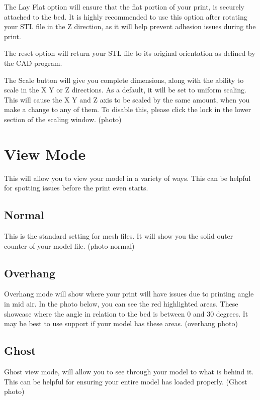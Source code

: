 The Lay Flat option will ensure that the flat portion of your print, is securely attached to the bed. It is highly recommended to use this option after rotating your STL file in the Z direction, as it will help prevent adhesion issues during the print.

The reset option will return your STL file to its original orientation as defined by the CAD program. 

The Scale button will give you complete dimensions, along with the ability to scale in the X Y or Z directions. As a default, it will be set to uniform scaling. This will cause the X Y and Z axis to be scaled by the same amount, when you make a change to any of them. To disable this, please click the lock in the lower section of the scaling window. (photo)

\section{View Mode}

This will allow you to view your model in a variety of ways. This can be helpful for spotting issues before the print even starts. 

\subsection{Normal}

This is the standard setting for mesh files. It will show you the solid outer counter of your model file. (photo normal)

\subsection{Overhang}

Overhang mode will show where your print will have issues due to printing angle in mid air. In the photo below, you can see the red highlighted areas. These showcase where the angle in relation to the bed is between 0 and 30 degrees. It may be best to use support if your model has these areas. (overhang photo)

\subsection{Ghost}

Ghost view mode, will allow you to see through your model to what is behind it. This can be helpful for ensuring your entire model has loaded properly. (Ghost photo)

